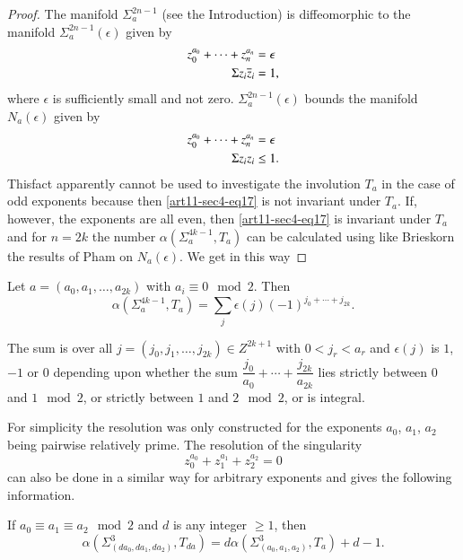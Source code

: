 \begin{proof}
The manifold $\Sigma^{2n-1}_{a}$ (see the Introduction) is diffeomorphic to the manifold $\Sigma^{2n-1}_{a}(\epsilon)$ given by
\begin{align}
z^{a_{0}}_{0}+\cdots+z^{a_{n}}_{n} &=\epsilon\label{art11-sec4-eq16}\\
\Sigma z_{i}\overline{z}_{i} &= 1,\notag
\end{align}
where $\epsilon$ is sufficiently small and not zero. $\Sigma^{2n-1}_{a}(\epsilon)$ bounds the manifold $N_{a}(\epsilon)$ given by
\begin{align}
z^{a_{0}}_{0}+\cdots+ z^{a_{n}}_{n} &=\epsilon\label{art11-sec4-eq17}\\
\Sigma z_{i}z_{i} &\leq 1.\notag
\end{align}
This\pageoriginale fact apparently cannot be used to investigate the involution $T_{a}$ in the case of odd exponents because then \eqref{art11-sec4-eq17} is not invariant under $T_{a}$. If, however, the exponents are all even, then \eqref{art11-sec4-eq17} is invariant under $T_{a}$ and for $n=2k$ the number $\alpha(\Sigma^{4k-1}_{a},T_{a})$ can be calculated using like Brieskorn \cite{art11-key1} the results of Pham on $N_{a}(\epsilon)$. We get in this way
\end{proof}

\begin{theorem*}
Let $a=(a_{0},a_{1},\ldots,a_{2k})$ with $a_{i}\equiv 0\mod 2$. Then
\begin{equation}
\alpha (\Sigma^{4k-1}_{a},T_{a})=\sum\limits_{j}\epsilon (j)(-1)^{j_{0}+\cdots+j_{2k}}.\label{art11-sec4-eq18}
\end{equation}
\end{theorem*}

The sum is over all $j=(j_{0},j_{1},\ldots,j_{2k})\in Z^{2k+1}$ with $0<j_{r}<a_{r}$ and $\epsilon(j)$ is $1$, $-1$ or $0$ depending upon whether the sum $\dfrac{j_{0}}{a_{0}}+\cdots+\dfrac{j_{2k}}{a_{2k}}$ lies strictly between $0$ and $1\mod 2$, or strictly between $1$ and $2\mod 2$, or is integral.

\begin{remark*}
For simplicity the resolution was only constructed for the exponents $a_{0}$, $a_{1}$, $a_{2}$ being pairwise relatively prime. The resolution of the singularity
$$
z^{a_{0}}_{0}+z^{a_{1}}_{1}+z^{a_{2}}_{2}=0
$$
can also be done in a similar way for arbitrary exponents and gives the following information.
\end{remark*}

\begin{theorem*}
If $a_{0}\equiv a_{1}\equiv a_{2}\mod 2$ and $d$ is any integer $\geq 1$, then
$$
\alpha(\Sigma^{3}_{(da_{0},da_{1},da_{2})},T_{da})=d\alpha(\Sigma^{3}_{(a_{0},a_{1},a_{2})},T_{a})+d-1.
$$
\end{theorem*}

